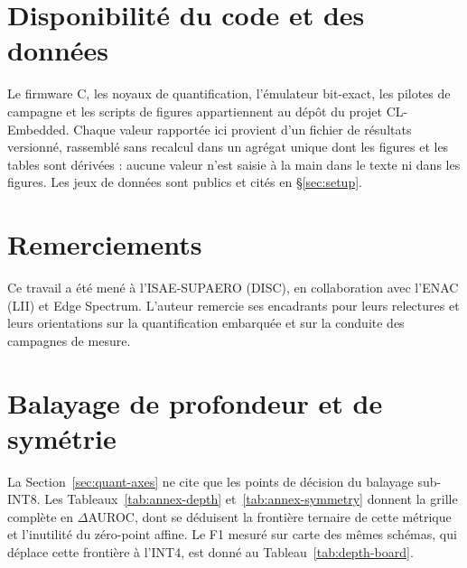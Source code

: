 \documentclass[11pt,a4paper]{article}
\begin{document}
\section*{Disponibilité du code et des données}

Le firmware C, les noyaux de quantification, l'émulateur bit-exact, les pilotes de campagne et les
scripts de figures appartiennent au dépôt du projet CL-Embedded. Chaque valeur rapportée ici provient d'un
fichier de résultats versionné, rassemblé sans recalcul dans un agrégat unique dont les figures et les
tables sont dérivées : aucune valeur n'est saisie à la main dans le texte ni dans les figures. Les jeux de
données sont publics et cités en \S\ref{sec:setup}.

\section*{Remerciements}

Ce travail a été mené à l'ISAE-SUPAERO (DISC), en collaboration avec l'ENAC (LII) et Edge Spectrum.
L'auteur remercie ses encadrants pour leurs relectures et leurs orientations sur la quantification
embarquée et sur la conduite des campagnes de mesure.




\appendix

\section{Balayage de profondeur et de symétrie}
\label{app:depth}

La Section~\ref{sec:quant-axes} ne cite que les points de décision du balayage
sub-INT8. Les Tableaux~\ref{tab:annex-depth} et~\ref{tab:annex-symmetry} donnent la
grille complète en $\Delta$AUROC, dont se déduisent la frontière ternaire de cette
métrique et l'inutilité du zéro-point affine. Le F1 mesuré sur carte des mêmes schémas,
qui déplace cette frontière à l'INT4, est donné au Tableau~\ref{tab:depth-board}.



\end{document}
